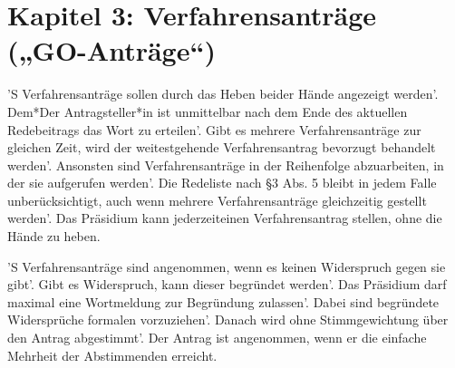 \documentclass[fontsize=12pt,parskip=half, ref=short]{scrartcl}
\begin{document}
\section*{Kapitel 3: Verfahrensanträge („GO-Anträge“)}

\begin{contract}

  \label{Par:Verf}
  'S Verfahrensanträge sollen durch das Heben beider Hände angezeigt werden'.
  Dem*Der Antragsteller*in ist unmittelbar nach dem Ende des aktuellen
  Redebeitrags das Wort zu erteilen'. Gibt es mehrere Verfahrensanträge zur
  gleichen Zeit, wird der weitestgehende Verfahrensantrag bevorzugt behandelt
  werden'. Ansonsten sind Verfahrensanträge in der Reihenfolge abzuarbeiten, in
  der sie aufgerufen werden'. Die Redeliste nach §3 Abs. 5 bleibt in jedem Falle
  unberücksichtigt, auch wenn mehrere Verfahrensanträge gleichzeitig gestellt
  werden'. Das Präsidium kann jederzeiteinen Verfahrensantrag stellen, ohne die
  Hände zu heben.

  'S Verfahrensanträge sind angenommen, wenn es keinen Widerspruch gegen sie
  gibt'. Gibt es Widerspruch, kann dieser begründet werden'. Das Präsidium darf
  maximal eine Wortmeldung zur Begründung zulassen'. Dabei sind begründete
  Widersprüche formalen vorzuziehen'. Danach wird ohne Stimmgewichtung über den
  Antrag abgestimmt'. Der Antrag ist angenommen, wenn er die einfache Mehrheit
  der Abstimmenden erreicht.


\end{contract}
\end{document}
